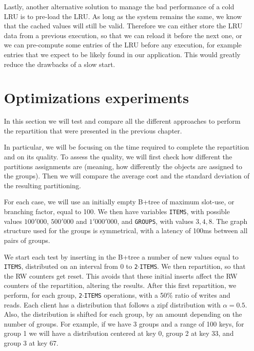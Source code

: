Lastly, another alternative solution to manage the bad performance of a cold LRU is to pre-load the LRU. As long as the system remains the same, we know that the cached values will still be valid. Therefore we can either store the LRU data from a previous execution, so that we can reload it before the next one, or we can pre-compute some entries of the LRU before any execution, for example entries that we expect to be likely found in our application. This would greatly reduce the drawbacks of a slow start.

\chapter{Optimizations experiments}\label{sec:optimizations-evaluation}
In this section we will test and compare all the different approaches to perform the repartition that were presented in the previous chapter.

In particular, we will be focusing on the time required to complete the repartition and on its quality. To assess the quality, we will first check how different the partitions assignments are (meaning, how differently the objects are assigned to the groups). Then we will compare the average cost and the standard deviation of the resulting partitioning. 

For each case, we will use an initially empty B+tree of maximum slot-use, or branching factor, equal to 100. We then have variables \texttt{ITEMS}, with possible values $100'000$, $500'000$ and $1'000'000$, and \texttt{GROUPS}, with values $3, 4, 8$. The graph structure used for the groups is symmetrical, with a latency of 100ms between all pairs of groups.

We start each test by inserting in the B+tree a number of new values equal to \texttt{ITEMS}, distributed on an interval from $0$ to \texttt{2$\cdot$ITEMS}. We then repartition, so that the RW counters get reset. This avoids that these initial inserts affect the RW counters of the repartition, altering the results. After this first repartition, we perform, for each group, \texttt{2$\cdot$ITEMS} operations, with a 50\% ratio of writes and reads. Each client has a distribution that follows a zipf distribution\cite{zipf} with $\alpha=0.5$. Also, the distribution is shifted for each group, by an amount depending on the number of groups. For example, if we have 3 groups and a range of 100 keys, for group 1 we will have a distribution centered at key 0, group 2 at key 33, and group 3 at key 67.

